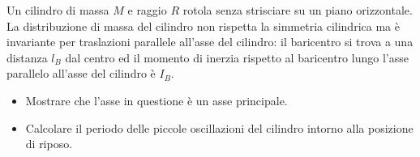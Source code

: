 \documentclass[../main.tex]{subfiles}
\begin{document}
\textex
Un cilindro di massa $M$ e raggio $R$ rotola senza strisciare su un piano orizzontale. La distribuzione di massa del cilindro non rispetta la simmetria cilindrica ma è invariante per traslazioni parallele all'asse del cilindro: il baricentro si trova a una distanza $l_B$ dal centro ed il momento di inerzia rispetto al baricentro lungo l'asse parallelo all'asse del cilindro è $I_B$.
\begin{itemize}
	\item Mostrare che l'asse in questione è un asse principale.
	\item Calcolare il periodo delle piccole oscillazioni del cilindro intorno alla posizione di riposo.
\end{itemize}

\solution
\end{document}
